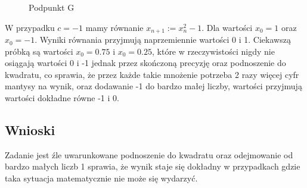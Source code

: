 \documentclass{article}
\begin{document}
\begin{figure}[H]
\centering
{}
\caption{Podpunkt G}
\end{figure}
W przypadku $c=-1$ mamy równanie $x_{n+1} := x_n^2 -1$. Dla wartości $x_0=1$ oraz $x_0=-1$. Wyniki równania przyjmują naprzemiennie wartości 0 i 1. Ciekawszą próbką są wartości $x_0=0.75$ i $x_0=0.25$, które w rzeczywistości nigdy nie osiągają wartości 0 i -1 jednak przez skończoną precyzję oraz podnoszenie do kwadratu, co sprawia, że przez każde takie mnożenie potrzeba 2 razy więcej cyfr mantysy na wynik, oraz dodawanie -1 do bardzo małej liczby, wartości przyjmują wartości dokładne równe -1 i 0.  
\subsection*{Wnioski}
Zadanie jest źle uwarunkowane podnoszenie do kwadratu oraz odejmowanie od bardzo małych liczb 1 sprawia, że wynik staje się dokładny w przypadkach gdzie taka sytuacja matematycznie nie może się wydarzyć.
\end{document}
